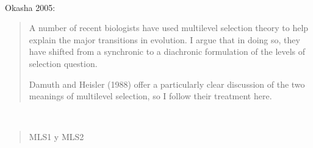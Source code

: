 \documentclass[a4paper,10pt]{article}
\begin{document}
\\

Okasha 2005:
\begin{quotation} \cite{okasha2005-multilevelTransitions}
    A number of recent biologists have used multilevel selection theory to help explain the major transitions in evolution.
    I argue that in doing so, they have shifted from a synchronic to a diachronic formulation of the levels of selection question.
    
    
    Damuth and Heisler (1988) offer a particularly clear discussion of the two meanings of multilevel selection, so I follow their treatment here.

\end{quotation}

\\

\begin{quotation} \cite{damuth1988-multilevelSelection}
MLS1 y MLS2
\end{quotation}
{\footnotesize


}
\end{document}
